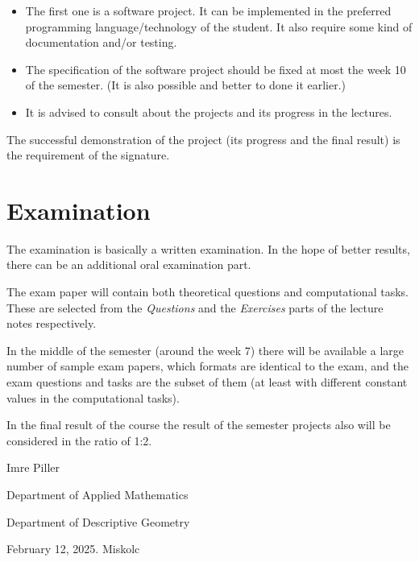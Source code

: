 \documentclass[a4paper,12pt]{article}
\begin{document}
\begin{itemize}
\item The first one is a software project. It can be implemented in the preferred programming language/technology of the student. It also require some kind of documentation and/or testing.
\item The specification of the software project should be fixed at most the week 10 of the semester. (It is also possible and better to done it earlier.)
\item It is advised to consult about the projects and its progress in the lectures.
\end{itemize}

The successful demonstration of the project (its progress and the final result) is the requirement of the signature.

\section{Examination}

The examination is basically a written examination. In the hope of better results, there can be an additional oral examination part.

The exam paper will contain both theoretical questions and computational tasks. These are selected from the \textit{Questions} and the \textit{Exercises} parts of the lecture notes respectively.

In the middle of the semester (around the week 7) there will be available a large number of sample exam papers, which formats are identical to the exam, and the exam questions and tasks are the subset of them (at least with different constant values in the computational tasks).

In the final result of the course the result of the semester projects also will be considered in the ratio of 1:2.

\vskip 18mm

\hskip 10cm Imre Piller

\hskip 7cm Department of Applied Mathematics

\hskip 7cm Department of Descriptive Geometry

\vskip 5mm

\noindent February 12, 2025. Miskolc
\end{document}
